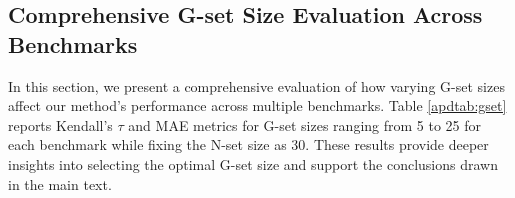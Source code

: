 
\subsection{Comprehensive G-set Size Evaluation Across Benchmarks}
\label{apd:gset}
In this section, we present a comprehensive evaluation of how varying G-set sizes affect our method’s performance across multiple benchmarks. Table \ref{apdtab:gset} reports Kendall's $\tau$ and MAE metrics for G-set sizes ranging from 5 to 25 for each benchmark while fixing the N-set size as 30. These results provide deeper insights into selecting the optimal G-set size and support the conclusions drawn in the main text.

